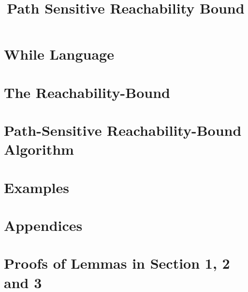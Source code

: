 \documentclass[a4paper,11pt]{article}
\begin{document}
\title{Path Sensitive Reachability Bound}

\author{}

\date{}

\maketitle
%
\tableofcontents

% 
\section{{While Language}}
\label{sec:language}

\section{{The Reachability-Bound}}
\label{sec:execution_rb}

\section{Path-Sensitive Reachability-Bound Algorithm}
\label{sec:static_rb}


\section{Examples}
\label{sec:example}





% 


%
% 
%
\clearpage
\appendix
{}
\section*{Appendices}
\section{Proofs of Lemmas in Section 1, 2 and 3}
\label{apdx:lemma_sec123}

\clearpage
% 
\clearpage
\end{document}
